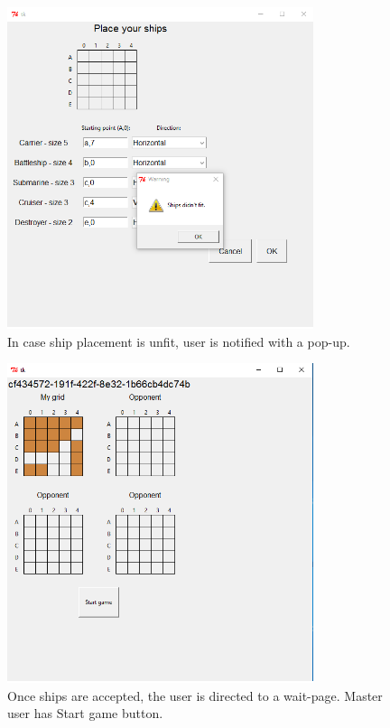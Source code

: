 \documentclass[]{article}
\begin{document}
\begin{figure}[!hbt]
	\centering
	\includegraphics[width=0.8\textwidth]{ShipUnfit.png}
	\caption{In case ship placement is unfit, user is notified with a pop-up.}
	\label{fig:ShipUnfit}
\end{figure}

\begin{figure}[!hbt]
	\centering
	\includegraphics[width=0.8\textwidth]{WaitPage.png}
	\caption{Once ships are accepted, the user is directed to a wait-page. Master user has Start game button.}
	\label{fig:Waitpage}
\end{figure}
\end{document}
